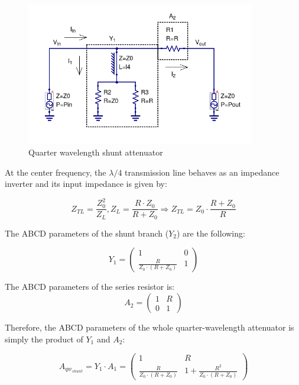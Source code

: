   \begin{figure}[ht]
    \centering
    \includegraphics[width=10cm]{./images/qw-shunt-attenuator-schematic.png}
    \caption{Quarter wavelength shunt attenuator}
    \label{fig:qw-shunt-attenuator-schematic}
  \end{figure}
  
\noindent At the center frequency, the $\lambda/4$ transmission line behaves as an impedance inverter and its input impedance is given by:

\begin{equation}
	Z_{TL} = \frac{Z_0^2}{Z_L}, Z_L = \frac{R \cdot Z_0}{R + Z_0} \Rightarrow Z_{TL} = Z_0 \cdot \frac{R + Z_0}{R}
\end{equation}

\noindent The ABCD parameters of the shunt branch ($Y_2$) are the following:

\begin{equation}
	Y_1 = \begin{pmatrix}
				1 & 0\\
				\frac{R}{Z_0 \cdot (R+Z_0)}  & 1
		\end{pmatrix}
\end{equation}

\noindent The ABCD parameters of the series resistor is:
\begin{equation}
	A_2 = \begin{pmatrix}
				1 & R\\
				0  & 1
		\end{pmatrix}
\end{equation}

\noindent Therefore, the ABCD parameters of the whole quarter-wavelength attenuator is simply the product of $Y_1$ and $A_2$:

\begin{equation}
	A_{qw_{shunt}} = Y_1 \cdot A_1 = \begin{pmatrix}
											1 & R\\
											\frac{R}{Z_0 \cdot(R+Z_0)}  & 1 + \frac{R^2}{Z_0 \cdot(R+Z_0)}
									\end{pmatrix}
\end{equation}

